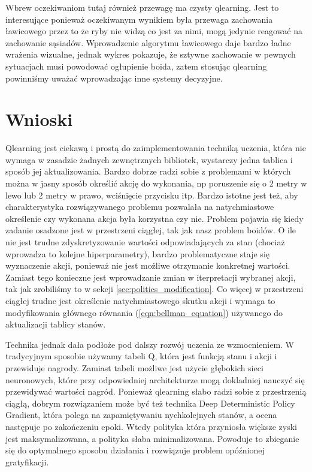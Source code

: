 \documentclass{article}
\begin{document}
Wbrew oczekiwaniom tutaj również przewagę ma czysty qlearning. Jest to interesujące ponieważ oczekiwanym wynikiem była przewaga zachowania ławicowego przez to że ryby nie widzą co jest za nimi, mogą jedynie reagować na zachowanie sąsiadów. Wprowadzenie algorytmu ławicowego daje bardzo ładne wrażenia wizualne, jednak wykres pokazuje, że sztywne zachowanie w pewnych sytuacjach musi powodować ogłupienie boida, zatem stosując qlearning powinniśmy uważać wprowadzając inne systemy decyzyjne.
\section{Wnioski}
Qlearning jest ciekawą i prostą do zaimplementowania techniką uczenia, która nie wymaga w zasadzie żadnych zewnętrznych bibliotek, wystarczy jedna tablica i sposób jej aktualizowania. Bardzo dobrze radzi sobie z problemami w których można w jasny sposób określić akcję do wykonania, np poruszenie się o 2 metry w lewo lub 2 metry w prawo, wciśnięcie przycisku itp. Bardzo istotne jest też, aby charakterystyka rozwiązywanego problemu pozwalała na natychmiastowe określenie czy wykonana akcja była korzystna czy nie. Problem pojawia się kiedy zadanie osadzone jest w przestrzeni ciągłej, tak jak nasz problem boidów. O ile nie jest trudne zdyskretyzowanie wartości odpowiadających za stan (chociaż wprowadza to kolejne hiperparametry), bardzo problematyczne staje się wyznaczenie akcji, ponieważ nie jest możliwe otrzymanie konkretnej wartości. Zamiast tego konieczne jest wprowadzanie zmian w iterpretacji wybranej akcji, tak jak zrobiliśmy to w sekcji \ref{sec:politics_modification}. Co więcej w przestrzeni ciągłej trudne jest określenie natychmiastowego skutku akcji i wymaga to modyfikowania głównego równania (\ref{eqn:bellman_equation}) używanego do aktualizacji tablicy stanów.

Technika jednak dała podłoże pod dalszy rozwój uczenia ze wzmocnieniem. W tradycyjnym sposobie używamy tabeli Q, która jest funkcją stanu i akcji i przewiduje nagrody. Zamiast tabeli możliwe jest użycie głębokich sieci neuronowych, które przy odpowiedniej architekturze mogą dokladniej nauczyć się przewidywać wartości nagród. Ponieważ qlearning słabo radzi sobie z przestrzenią ciągłą, dobrym rozwiązaniem może być też technika Deep Deterministic Policy Gradient, która polega na zapamiętywaniu nychkolejnych stanów, a ocena następuje po zakończeniu epoki. Wtedy polityka która przyniosła większe zyski jest maksymalizowana, a polityka słaba minimalizowana. Powoduje to zbieganie się do optymalnego sposobu działania i rozwiązuje problem opóźnionej gratyfikacji.
\end{document}
